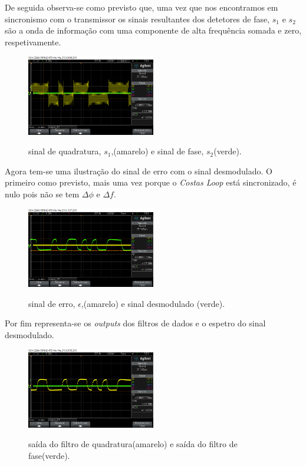 \documentclass[11pt]{article}
\numberwithin{equation}{section}
\begin{document}
	De seguida observa-se como previsto que, uma vez que nos encontramos em sincronismo com o transmissor os sinais resultantes dos detetores de fase, $s_1$ e $s_2$ são a onda de informação com uma componente de alta frequência somada e zero, respetivamente.
	
	\begin{figure}[H]
		\centering
		\includegraphics[width=0.5\textwidth]{./s1_s2n}~\\
		\caption{sinal de quadratura, $s_1$,(amarelo) e sinal de fase, $s_2$(verde).}
		\label{s1_s2}
	\end{figure}
	
	Agora tem-se uma ilustração do sinal de erro com o sinal desmodulado. O primeiro como previsto, mais uma vez porque o \textit{Costas Loop} está sincronizado, é nulo pois não se tem $\Delta\phi$ e $\Delta f$.
	
	\begin{figure}[H]
		\centering
		\includegraphics[width=0.5\textwidth]{./erro_y1n}~\\
		\caption{sinal de erro, $\epsilon$,(amarelo) e sinal desmodulado (verde).}
		\label{erro_y1n}
	\end{figure}
	
	Por fim representa-se os \textit{outputs} dos filtros de dados e o espetro do sinal desmodulado.
	
	\begin{figure}[H]
		\centering
		\includegraphics[width=0.5\textwidth]{./y1_y2n}~\\
		\caption{saída do filtro de quadratura(amarelo) e saída do filtro de fase(verde).}
		\label{y1_y2n}
	\end{figure}
	
\end{document}
